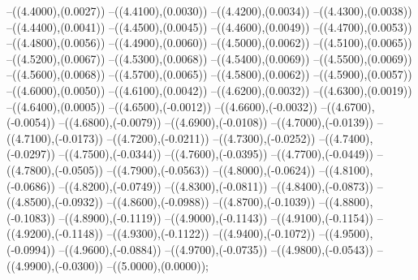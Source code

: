 {	--({\sx*(4.4000)},{\sy*(0.0027)})
	--({\sx*(4.4100)},{\sy*(0.0030)})
	--({\sx*(4.4200)},{\sy*(0.0034)})
	--({\sx*(4.4300)},{\sy*(0.0038)})
	--({\sx*(4.4400)},{\sy*(0.0041)})
	--({\sx*(4.4500)},{\sy*(0.0045)})
	--({\sx*(4.4600)},{\sy*(0.0049)})
	--({\sx*(4.4700)},{\sy*(0.0053)})
	--({\sx*(4.4800)},{\sy*(0.0056)})
	--({\sx*(4.4900)},{\sy*(0.0060)})
	--({\sx*(4.5000)},{\sy*(0.0062)})
	--({\sx*(4.5100)},{\sy*(0.0065)})
	--({\sx*(4.5200)},{\sy*(0.0067)})
	--({\sx*(4.5300)},{\sy*(0.0068)})
	--({\sx*(4.5400)},{\sy*(0.0069)})
	--({\sx*(4.5500)},{\sy*(0.0069)})
	--({\sx*(4.5600)},{\sy*(0.0068)})
	--({\sx*(4.5700)},{\sy*(0.0065)})
	--({\sx*(4.5800)},{\sy*(0.0062)})
	--({\sx*(4.5900)},{\sy*(0.0057)})
	--({\sx*(4.6000)},{\sy*(0.0050)})
	--({\sx*(4.6100)},{\sy*(0.0042)})
	--({\sx*(4.6200)},{\sy*(0.0032)})
	--({\sx*(4.6300)},{\sy*(0.0019)})
	--({\sx*(4.6400)},{\sy*(0.0005)})
	--({\sx*(4.6500)},{\sy*(-0.0012)})
	--({\sx*(4.6600)},{\sy*(-0.0032)})
	--({\sx*(4.6700)},{\sy*(-0.0054)})
	--({\sx*(4.6800)},{\sy*(-0.0079)})
	--({\sx*(4.6900)},{\sy*(-0.0108)})
	--({\sx*(4.7000)},{\sy*(-0.0139)})
	--({\sx*(4.7100)},{\sy*(-0.0173)})
	--({\sx*(4.7200)},{\sy*(-0.0211)})
	--({\sx*(4.7300)},{\sy*(-0.0252)})
	--({\sx*(4.7400)},{\sy*(-0.0297)})
	--({\sx*(4.7500)},{\sy*(-0.0344)})
	--({\sx*(4.7600)},{\sy*(-0.0395)})
	--({\sx*(4.7700)},{\sy*(-0.0449)})
	--({\sx*(4.7800)},{\sy*(-0.0505)})
	--({\sx*(4.7900)},{\sy*(-0.0563)})
	--({\sx*(4.8000)},{\sy*(-0.0624)})
	--({\sx*(4.8100)},{\sy*(-0.0686)})
	--({\sx*(4.8200)},{\sy*(-0.0749)})
	--({\sx*(4.8300)},{\sy*(-0.0811)})
	--({\sx*(4.8400)},{\sy*(-0.0873)})
	--({\sx*(4.8500)},{\sy*(-0.0932)})
	--({\sx*(4.8600)},{\sy*(-0.0988)})
	--({\sx*(4.8700)},{\sy*(-0.1039)})
	--({\sx*(4.8800)},{\sy*(-0.1083)})
	--({\sx*(4.8900)},{\sy*(-0.1119)})
	--({\sx*(4.9000)},{\sy*(-0.1143)})
	--({\sx*(4.9100)},{\sy*(-0.1154)})
	--({\sx*(4.9200)},{\sy*(-0.1148)})
	--({\sx*(4.9300)},{\sy*(-0.1122)})
	--({\sx*(4.9400)},{\sy*(-0.1072)})
	--({\sx*(4.9500)},{\sy*(-0.0994)})
	--({\sx*(4.9600)},{\sy*(-0.0884)})
	--({\sx*(4.9700)},{\sy*(-0.0735)})
	--({\sx*(4.9800)},{\sy*(-0.0543)})
	--({\sx*(4.9900)},{\sy*(-0.0300)})
	--({\sx*(5.0000)},{\sy*(0.0000)});
}
